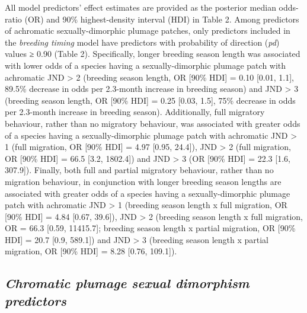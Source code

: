 \documentclass[
  a4paper,
]{article}
\begin{document}
All model predictors' effect estimates are provided as the posterior
median odds-ratio (OR) and 90\% highest-density interval (HDI) in Table
2. Among predictors of achromatic sexually-dimorphic plumage patches,
only predictors included in the \emph{breeding timing} model have
predictors with probability of direction (\emph{pd}) values ≥ 0.90
(Table 2). Specifically, longer breeding season length was associated
with lower odds of a species having a sexually-dimorphic plumage patch
with achromatic JND \textgreater{} 2 (breeding season length, OR {[}90\%
HDI{]} = 0.10 {[}0.01, 1.1{]}, 89.5\% decrease in odds per 2.3-month
increase in breeding season) and JND \textgreater{} 3 (breeding season
length, OR {[}90\% HDI{]} = 0.25 {[}0.03, 1.5{]}, 75\% decrease in odds
per 2.3-month increase in breeding season). Additionally, full migratory
behaviour, rather than no migratory behaviour, was associated with
greater odds of a species having a sexually-dimorphic plumage patch with
achromatic JND \textgreater{} 1 (full migration, OR {[}90\% HDI{]} =
4.97 {[}0.95, 24.4{]}), JND \textgreater{} 2 (full migration, OR {[}90\%
HDI{]} = 66.5 {[}3.2, 1802.4{]}) and JND \textgreater{} 3 (OR {[}90\%
HDI{]} = 22.3 {[}1.6, 307.9{]}). Finally, both full and partial
migratory behaviour, rather than no migration behaviour, in conjunction
with longer breeding season lengths are associated with greater odds of
a species having a sexually-dimorphic plumage patch with achromatic JND
\textgreater{} 1 (breeding season length x full migration, OR {[}90\%
HDI{]} = 4.84 {[}0.67, 39.6{]}), JND \textgreater{} 2 (breeding season
length x full migration, OR = 66.3 {[}0.59, 11415.7{]}; breeding season
length x partial migration, OR {[}90\% HDI{]} = 20.7 {[}0.9, 589.1{]})
and JND \textgreater{} 3 (breeding season length x partial migration, OR
{[}90\% HDI{]} = 8.28 {[}0.76, 109.1{]}).

\hypertarget{chromatic-plumage-sexual-dimorphism-predictors}{%
\subsection{\texorpdfstring{\emph{Chromatic plumage sexual dimorphism
predictors}}{Chromatic plumage sexual dimorphism predictors}}\label{chromatic-plumage-sexual-dimorphism-predictors}}
\end{document}
